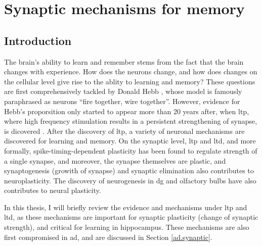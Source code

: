 \begin{comment}
\subsubsection{Conclusion}
\citep{opitz14} hpc and memory
\citep{shohamy13} hpc in cognition
\citep{huijgen15} hpc node of memory

\citep{lee16} lesion studies review
\citep{mcdonald13} memory to behaviour
\citep{middei14} hpc in learning disorder
\citep{eichenbaum14} hpc where vs episodic
\citep{sasaki15} hpc memory circuit
\end{comment}

\section{Synaptic mechanisms for memory}
\subsection{Introduction}
The brain's ability to learn and remember stems from the fact that the brain changes with experience. How does the neurons change, and how does changes on the cellular level give rise to the ablity to learning and memory? These questions are first comprehensively tackled by Donald Hebb \citeyear{hebb49}, whose model is famously paraphrased as neurons ``fire together, wire together''. However, evidence for Hebb's proporsition only started to appear more than 20 years after, when \gls{ltp}, where high frequency stimulation results in a persistent strengthening of synapse, is dicovered \citep{bliss73}. After the discovery of \gls{ltp}, a variety of neuronal mechanisms are discovered for learning and memory. On the synaptic level, \gls{ltp} and \gls{ltd}, and more formally, spike-timing-dependent plasticity has been found to regulate strength of a single synapse, and moreover, the synapse themselves are plastic, and synaptogenesis (growith of synapse) and synaptic elimination also contributes to neuroplasticity. The discovery of neurogenesis in \gls{dg} and olfactory bulbs have also contributes to neural plasticity.

In this thesis, I will briefly review the evidence and mechanisms under \gls{ltp} and \gls{ltd}, as these mechanisms are important for synaptic plasticity (change of synaptic strength), and critical for learning in hippocampus. These mechanisms are also first compromised in \gls{ad}, and are discussed in Section \ref{ad.synaptic}. 

